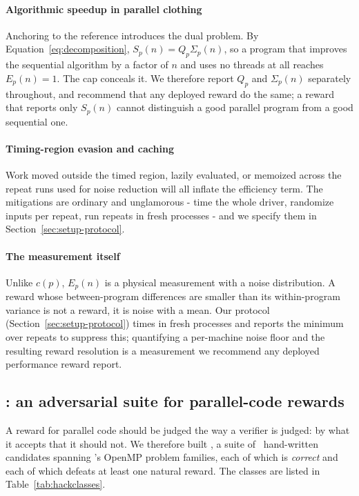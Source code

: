 \paragraph*{Algorithmic speedup in parallel clothing}
Anchoring to the reference introduces the dual problem. By
Equation~\eqref{eq:decomposition}, $S_p(n) = Q_p\Sigma_p(n)$, so a program that
improves the sequential algorithm by a factor of $n$ and uses no threads at all
reaches $E_p(n)=1$. The cap conceals it. We therefore report $Q_p$ and
$\Sigma_p(n)$ separately throughout, and recommend that any deployed reward do
the same; a reward that reports only $S_p(n)$ cannot distinguish a good
parallel program from a good sequential one.

\paragraph*{Timing-region evasion and caching}
Work moved outside the timed region, lazily evaluated, or memoized across the
repeat runs used for noise reduction will all inflate the efficiency term. The
mitigations are ordinary and unglamorous - time the whole driver, randomize
inputs per repeat, run repeats in fresh processes - and we specify them in
Section~\ref{sec:setup-protocol}.

\paragraph*{The measurement itself}
Unlike $c(p)$, $E_p(n)$ is a physical measurement with a noise distribution. A
reward whose between-program differences are smaller than its within-program
variance is not a reward, it is noise with a mean. Our protocol
(Section~\ref{sec:setup-protocol}) times in fresh processes and reports the
minimum over repeats to suppress this; quantifying a per-machine noise floor and
the resulting reward resolution is a measurement we recommend any deployed
performance reward report.

\subsection{\PG: an adversarial suite for parallel-code rewards}
\label{sec:reward-paragate}

A reward for parallel code should be judged the way a verifier is judged: by
what it accepts that it should not. We therefore built \PG, a suite of
\NHacks\ hand-written candidates spanning \ParEval's OpenMP problem families,
each of which is \emph{correct} and each of which defeats at least one natural
reward. The classes are listed in Table~\ref{tab:hackclasses}.

